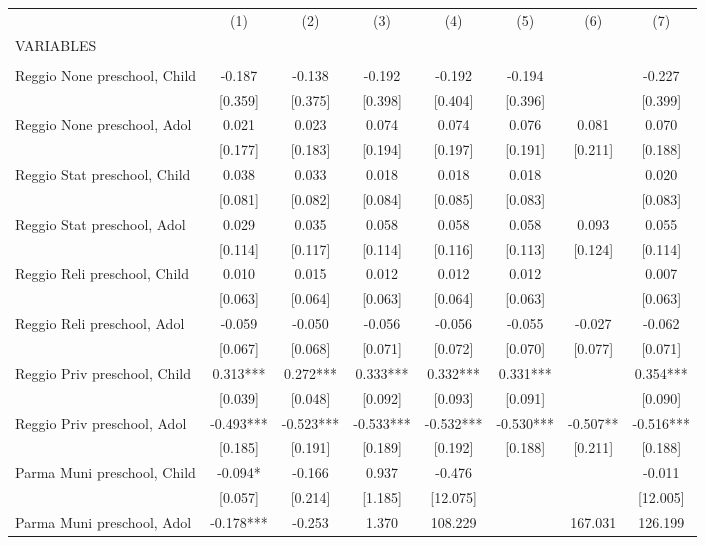 \begin{tabular}{lccccccc} \hline
 & (1) & (2) & (3) & (4) & (5) & (6) & (7) \\
VARIABLES &  &  &  &  &  &  &  \\ \hline
 &  &  &  &  &  &  &  \\
Reggio None preschool, Child & -0.187 & -0.138 & -0.192 & -0.192 & -0.194 &  & -0.227 \\
 & [0.359] & [0.375] & [0.398] & [0.404] & [0.396] &  & [0.399] \\
Reggio None preschool, Adol & 0.021 & 0.023 & 0.074 & 0.074 & 0.076 & 0.081 & 0.070 \\
 & [0.177] & [0.183] & [0.194] & [0.197] & [0.191] & [0.211] & [0.188] \\
Reggio Stat preschool, Child & 0.038 & 0.033 & 0.018 & 0.018 & 0.018 &  & 0.020 \\
 & [0.081] & [0.082] & [0.084] & [0.085] & [0.083] &  & [0.083] \\
Reggio Stat preschool, Adol & 0.029 & 0.035 & 0.058 & 0.058 & 0.058 & 0.093 & 0.055 \\
 & [0.114] & [0.117] & [0.114] & [0.116] & [0.113] & [0.124] & [0.114] \\
Reggio Reli preschool, Child & 0.010 & 0.015 & 0.012 & 0.012 & 0.012 &  & 0.007 \\
 & [0.063] & [0.064] & [0.063] & [0.064] & [0.063] &  & [0.063] \\
Reggio Reli preschool, Adol & -0.059 & -0.050 & -0.056 & -0.056 & -0.055 & -0.027 & -0.062 \\
 & [0.067] & [0.068] & [0.071] & [0.072] & [0.070] & [0.077] & [0.071] \\
Reggio Priv preschool, Child & 0.313*** & 0.272*** & 0.333*** & 0.332*** & 0.331*** &  & 0.354*** \\
 & [0.039] & [0.048] & [0.092] & [0.093] & [0.091] &  & [0.090] \\
Reggio Priv preschool, Adol & -0.493*** & -0.523*** & -0.533*** & -0.532*** & -0.530*** & -0.507** & -0.516*** \\
 & [0.185] & [0.191] & [0.189] & [0.192] & [0.188] & [0.211] & [0.188] \\
Parma Muni preschool, Child & -0.094* & -0.166 & 0.937 & -0.476 &  &  & -0.011 \\
 & [0.057] & [0.214] & [1.185] & [12.075] &  &  & [12.005] \\
Parma Muni preschool, Adol & -0.178*** & -0.253 & 1.370 & 108.229 &  & 167.031 & 126.199 \\

\end{tabular}
